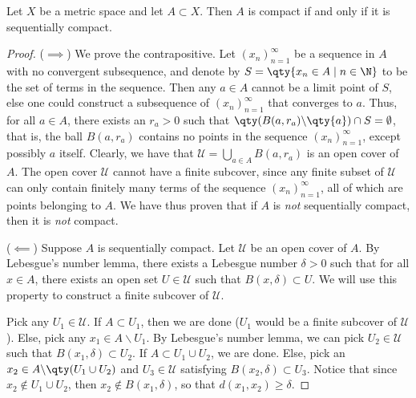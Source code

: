  \begin{theorem}
   Let \( X \) be a metric space and let \( A\subset X \). Then \( A \) is compact if and only if it is sequentially compact.
 \end{theorem}
 \begin{proof}
   (\( \implies \)) We prove the contrapositive. Let \((x_n)_{n=1}^\infty  \) be a sequence in \( A \) with no convergent subsequence, and denote by \( S=\qty{x_n\in A\mid n\in\N} \) to be the set of terms in the sequence. Then any \( a\in A \) cannot be a limit point of \( S \), else one could construct a subsequence of \( (x_n)_{n=1}^\infty \) that converges to \( a \). Thus, for all \( a\in A \), there exists an \( r_a>0 \) such that \( \qty(B(a,r_a)\backslash\qty{a})\cap S=\emptyset \), that is, the ball \( B(a,r_a) \) contains no points in the sequence \( (x_n)_{n=1}^\infty \), except possibly \( a \) itself. Clearly, we have that \( \mathcal{U}=\bigcup_{a\in A}B(a,r_a) \) is an open cover of \( A \). The open cover \( \mathcal{U} \) cannot have a finite subcover, since any finite subset of \( \mathcal{U} \) can only contain finitely many terms of the sequence \( (x_n)_{n=1}^\infty \), all of which are points belonging to \( A \). We have thus proven that if \( A \) is \emph{not} sequentially compact, then it is \emph{not} compact.

   \vspace{3mm}

   (\( \impliedby \)) Suppose \( A \) is sequentially compact. Let \( \mathcal{U} \) be an open cover of \( A \). By Lebesgue's number lemma, there exists a Lebesgue number \( \delta>0 \) such that for all \( x\in A \), there exists an open set \( U\in\mathcal{U} \) such that \( B(x,\delta)\subset U \). We will use this property to construct a finite subcover of \( \mathcal{U} \).

   \vspace{3mm}

   Pick any \( U_1\in\mathcal{U} \). If \( A\subset U_1 \), then we are done (\( U_1 \) would be a finite subcover of \( \mathcal{U} \)). Else, pick any \( x_1\in A\backslash U_1 \). By Lebesgue's number lemma, we can pick \( U_2\in\mathcal{U} \) such that \( B(x_1,\delta)\subset U_2 \). If \( A\subset U_1\cup U_2 \), we are done. Else, pick an \( x_2\in A\backslash\qty(U_1\cup U_2) \) and \( U_3\in\mathcal{U} \) satisfying \( B(x_2,\delta)\subset U_3 \). Notice that since \( x_2\notin U_1\cup U_2 \), then \( x_2\notin B(x_1,\delta) \), so that \( d(x_1,x_2)\geq\delta \).


\end{proof}
